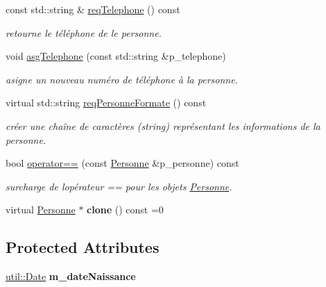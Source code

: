 \begin{DoxyCompactItemize}
const std\+::string \& \hyperlink{classhockey_1_1Personne_ad6b6a4dc6bb847c2bec38acb9104e378}{req\+Telephone} () const
\begin{DoxyCompactList}\small\item\em retourne le téléphone de le personne. \end{DoxyCompactList}\item 
void \hyperlink{classhockey_1_1Personne_a82838fb8c45d908b64396e14787f4d52}{asg\+Telephone} (const std\+::string \&p\+\_\+telephone)
\begin{DoxyCompactList}\small\item\em asigne un nouveau numéro de téléphone à la personne. \end{DoxyCompactList}\item 
virtual std\+::string \hyperlink{classhockey_1_1Personne_ae67b3d253c1fa8a090dd8040ca1e8ccc}{req\+Personne\+Formate} () const
\begin{DoxyCompactList}\small\item\em créer une chaîne de caractères (string) représentant les informations de la personne. \end{DoxyCompactList}\item 
bool \hyperlink{classhockey_1_1Personne_a5a519977d574d18b919eb39e6cfbf62b}{operator==} (const \hyperlink{classhockey_1_1Personne}{Personne} \&p\+\_\+personne) const
\begin{DoxyCompactList}\small\item\em surcharge de l\textquotesingle{}opérateur == pour les objets \hyperlink{classhockey_1_1Personne}{Personne}. \end{DoxyCompactList}\item 
\mbox{\label{classhockey_1_1Personne_a4e81e9f921891b0bd1b3bbe859d3fae0}} 
virtual \hyperlink{classhockey_1_1Personne}{Personne} $\ast$ {\bfseries clone} () const =0
\end{DoxyCompactItemize}
\subsection*{Protected Attributes}
\begin{DoxyCompactItemize}
\item 
\mbox{\label{classhockey_1_1Personne_a77d1c72b30b7cfad33714688d665ff05}} 
\hyperlink{classutil_1_1Date}{util\+::\+Date} {\bfseries m\+\_\+date\+Naissance}
\end{DoxyCompactItemize}


